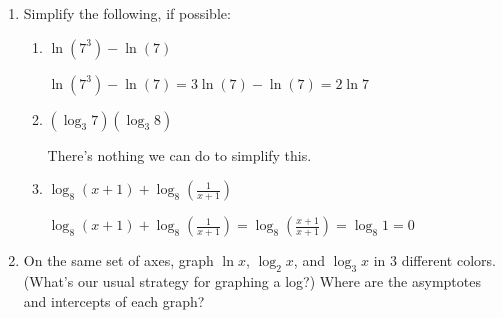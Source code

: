 \documentclass{article}
\begin{document}
\begin{enumerate}[resume]
\begin{enumerate}
  \end{enumerate}

\item  Simplify the following, if possible:

    \begin{enumerate}

    \item $\displaystyle \ln(7^3) - \ln(7)$

    \begin{solution}
        $\ln(7^3) - \ln(7) = 3\ln (7)-\ln (7) = 2\ln 7$
    \end{solution}

    \item $\displaystyle \left( \log_3 7 \right) \left( \log_3 8 \right)$

    \begin{solution}
      There's nothing we can do to simplify this.
    \end{solution}

    \item
      $\displaystyle \log_8 (x+1) + \log_8 \left( \frac{1}{x+1} \right)$

    \begin{solution}
        $\displaystyle \log_8 (x+1) + \log_8 \left( \frac{1}{x+1} \right)
        = \log_8\left(\frac{x+1}{x+1}\right) = \log_8 1 = 0$
    \end{solution}

    \end{enumerate}
  \probonly{\end{multicols}}


\item  \label{log-graphs}


  \begin{problem}[\stretch{1.5}]
    On the same set of axes, graph $\ln x$, $\log_2 x$, and $\log_3 x$ in 3 different colors. (What's our usual strategy for graphing a log?) Where are the asymptotes and intercepts of each graph? 
  \end{problem}


\end{enumerate}
\end{document}
